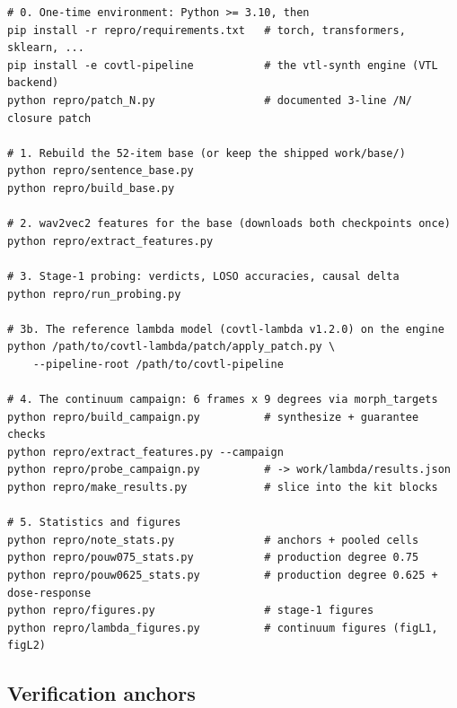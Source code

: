 \documentclass[11pt,a4paper]{article}
\begin{document}
\begingroup
\footnotesize
\begin{verbatim}
# 0. One-time environment: Python >= 3.10, then
pip install -r repro/requirements.txt   # torch, transformers, sklearn, ...
pip install -e covtl-pipeline           # the vtl-synth engine (VTL backend)
python repro/patch_N.py                 # documented 3-line /N/ closure patch

# 1. Rebuild the 52-item base (or keep the shipped work/base/)
python repro/sentence_base.py
python repro/build_base.py

# 2. wav2vec2 features for the base (downloads both checkpoints once)
python repro/extract_features.py

# 3. Stage-1 probing: verdicts, LOSO accuracies, causal delta
python repro/run_probing.py

# 3b. The reference lambda model (covtl-lambda v1.2.0) on the engine
python /path/to/covtl-lambda/patch/apply_patch.py \
    --pipeline-root /path/to/covtl-pipeline

# 4. The continuum campaign: 6 frames x 9 degrees via morph_targets
python repro/build_campaign.py          # synthesize + guarantee checks
python repro/extract_features.py --campaign
python repro/probe_campaign.py          # -> work/lambda/results.json
python repro/make_results.py            # slice into the kit blocks

# 5. Statistics and figures
python repro/note_stats.py              # anchors + pooled cells
python repro/pouw075_stats.py           # production degree 0.75
python repro/pouw0625_stats.py          # production degree 0.625 + dose-response
python repro/figures.py                 # stage-1 figures
python repro/lambda_figures.py          # continuum figures (figL1, figL2)
\end{verbatim}
\endgroup

\subsection{Verification anchors}
\end{document}
